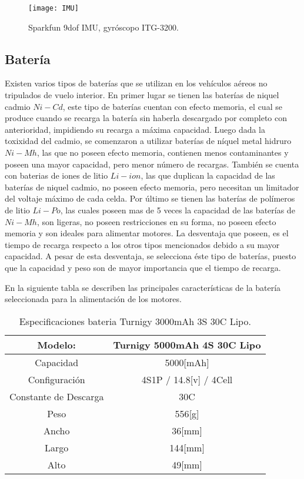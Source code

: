 \documentclass[../main.tex]{subfiles}
\begin{document}
\begin{figure}[H]
\noindent \begin{centering}
\texttt{[image: IMU]}
\par\end{centering}
\caption{Sparkfun 9dof IMU, gyróscopo ITG-3200.}
\end{figure}

\textcompwordmark{}

\subsection{Batería}

Existen varios tipos de baterías que se utilizan en los vehículos
aéreos no tripulados de vuelo interior. En primer lugar se tienen
las baterías de niquel cadmio $Ni-Cd$, este tipo de baterías cuentan
con efecto memoria, el cual se produce cuando se recarga la batería
sin haberla descargado por completo con anterioridad, impidiendo su
recarga a máxima capacidad. Luego dada la toxixidad del cadmio, se
comenzaron a utilizar baterías de níquel metal hidruro $Ni-Mh$, las
que no poseen efecto memoria, contienen menos contaminantes y poseen
una mayor capacidad, pero menor número de recargas. También se cuenta
con baterias de iones de litio $Li-ion$, las que duplican la capacidad
de las baterías de niquel cadmio, no poseen efecto memoria, pero necesitan
un limitador del voltaje máximo de cada celda. Por último se tienen
las baterías de polímeros de litio $Li-Po$, las cuales poseen mas
de 5 veces la capacidad de las baterías de $Ni-Mh$, son ligeras,
no poseen restricciones en su forma, no poseen efecto memoria y son
ideales para alimentar motores. La desventaja que poseen, es el tiempo
de recarga respecto a los otros tipos mencionados debido a su mayor
capacidad. A pesar de esta desventaja, se selecciona éste tipo de
baterías, puesto que la capacidad y peso son de mayor importancia
que el tiempo de recarga.

En la siguiente tabla se describen las principales características
de la batería seleccionada para la alimentación de los motores.

\begin{table}[H]
\noindent \begin{centering}
\begin{tabular}{|c|c|}
\hline 
\multicolumn{1}{|c}{Modelo:} & Turnigy 5000mAh 4S 30C Lipo\tabularnewline
\hline 
\hline 
Capacidad  & 5000{[}mAh{]}\tabularnewline
\hline 
Configuración & 4S1P / 14.8{[}v{]} / 4Cell\tabularnewline
\hline 
Constante de Descarga & 30C\tabularnewline
\hline 
Peso & 556{[}g{]}\tabularnewline
\hline 
Ancho & 36{[}mm{]}\tabularnewline
\hline 
Largo & 144{[}mm{]}\tabularnewline
\hline 
Alto & 49{[}mm{]}\tabularnewline
\hline 
\end{tabular}
\par\end{centering}
\caption{Especificaciones bateria Turnigy 3000mAh 3S 30C Lipo.}
\end{table}
\end{document}
